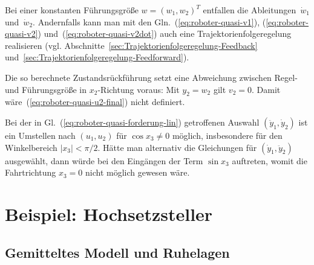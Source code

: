 \begin{example}
Bei einer konstanten Führungsgröße $w=(w_{1},w_{2})^{T}$ entfallen
die Ableitungen~$\dot{w}_{1}$ und~$\dot{w}_{2}$. Andernfalls kann
man mit den Gln.~(\ref{eq:roboter-quasi-v1}), (\ref{eq:roboter-quasi-v2})
und~(\ref{eq:roboter-quasi-v2dot}) auch eine Trajektorienfolgeregelung
realisieren (vgl. Ab\-schnitte~\ref{sec:Trajektorienfolgeregelung-Feedback}
und~\ref{sec:Trajektorienfolgeregelung-Feedforward}).

Die so berechnete Zustandsrückführung setzt eine Abweichung zwischen
Regel- und Führungsgröße in $x_{2}$-Richtung voraus: Mit $y_{2}=w_{2}$
gilt $v_{2}=0$. Damit wäre~(\ref{eq:roboter-quasi-u2-final}) nicht
definiert. 

Bei der in Gl.~(\ref{eq:roboter-quasi-forderung-lin}) getroffenen
Auswahl $(\ddot{y}_{1},\dot{y}_{2})$ ist ein Umstellen nach $(u_{1},u_{2})$
für $\cos x_{3}\neq0$ möglich, insbesondere für den Winkelbereich
$|x_{3}|<\pi/2$. Hätte man alternativ die Gleichungen für $(\dot{y}_{1},\ddot{y}_{2})$
ausgewählt, dann würde bei den Eingängen der Term $\sin x_{3}$ auftreten,
womit die Fahrtrichtung $x_{3}=0$ nicht möglich gewesen wäre.
\end{example}

\section{Beispiel: Hochsetzsteller\label{subsec:Hochsetzsteller}}

\subsection{Gemitteltes Modell und Ruhelagen\label{subsec:Hochsetzsteller-Gemitteltes-Modell-Ruhelagen}}

